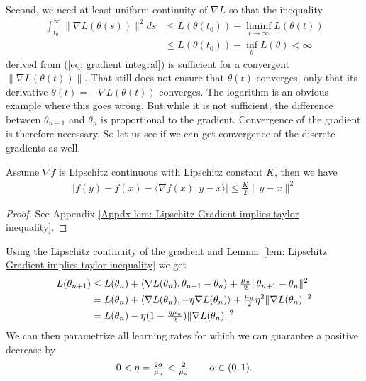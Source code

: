 Second, we need at least uniform continuity of \(\nabla L\) so that the inequality
%
\begin{align}\label{eq: bounded gradient integral}
	\int_{t_0}^\infty \|\nabla L(\theta(s))\|^2 ds
	&\le L(\theta(t_0)) - \liminf_{t\to\infty} L(\theta(t)) \\
	&\le L(\theta(t_0)) - \inf_{\theta} L(\theta) < \infty \nonumber
\end{align}
%
derived from (\ref{eq: gradient integral}) is sufficient for a convergent
\(\|\nabla L(\theta(t))\|\). That still does not ensure that \(\theta(t)\)
converges, only that its derivative \(\dot{\theta}(t) = -\nabla L(\theta(t))\)
converges. The logarithm is an obvious example where this goes wrong. But
while it is not sufficient, the difference between \(\theta_{n+1}\) and
\(\theta_n\) is proportional to the gradient. Convergence of the gradient is
therefore necessary.
So let us see if we can get convergence of the discrete gradients as well.
%
\begin{lemma}
	\label{lem: Lipschitz Gradient implies taylor inequality}
	Assume \(\nabla f\) is Lipschitz continuous with Lipschitz constant \(K\),
	then we have
	\begin{align*}
		| f(y) - f(x) - \langle \nabla f(x), y-x\rangle | \le \tfrac{K}2 \|y-x\|^2
	\end{align*}
\end{lemma}
\begin{proof}
	See Appendix \ref{Appdx-lem: Lipschitz Gradient implies taylor inequality}.
\end{proof}
%
\noindent
Using the Lipschitz continuity of the gradient and Lemma~\ref{lem: Lipschitz
Gradient implies taylor inequality} we get
%
\begin{align}
	L(\theta_{n+1})
	&\le L(\theta_n) 
	+ \langle\nabla L(\theta_n),\theta_{n+1} - \theta_n\rangle
	+ \tfrac{\mu_u}{2} \| \theta_{n+1} - \theta_n\|^2 
	\label{bound increment}\\
	&= L(\theta_n)
	+ \langle\nabla L(\theta_n), -\eta\nabla L(\theta_n)\rangle
	+ \tfrac{\mu_u}{2}\eta^2\| \nabla L(\theta_n)\|^2
	\nonumber\\
	&=L(\theta_n) - \eta(1-\tfrac{\eta \mu_u}{2})\|\nabla L(\theta_n)\|^2
	\nonumber
\end{align}
%
We can then parametrize all learning rates for which we can guarantee a positive
decrease by
\begin{align}\label{learning rate restrictions}
	0<\eta=\tfrac{2\alpha}{\mu_u}<\tfrac2{\mu_u} \qquad \alpha \in (0,1).
\end{align}
